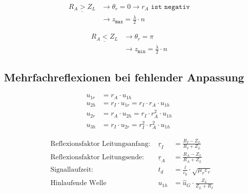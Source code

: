 \begin{align*}
    \underline{R_A > Z_L} & \rightarrow\theta_r = 0 \rightarrow r_A \texttt{ ist negativ} \\
                          & \rightarrow z_\texttt{max}=\frac{\lambda}{2}\cdot n
\end{align*}

\begin{align*}
    \underline{R_A < Z_L} & \rightarrow\theta_r = \pi                           \\
                          & \rightarrow z_\texttt{min}=\frac{\lambda}{2}\cdot n
\end{align*}

\columnbreak
\subsection{Mehrfachreflexionen bei fehlender Anpassung}

\begin{align*}
    u_{1r} & = r_A\cdot u_{1h}                                \\
    u_{2h} & = r_I\cdot u_{1r} = r_I\cdot r_A\cdot u_{1h}     \\
    u_{2r} & = r_A\cdot u_{2h} = r_I\cdot r_A^2\cdot u_{1h}   \\
    u_{3h} & = r_I\cdot u_{2r} = r_I^2\cdot r_A^2\cdot u_{1h}
\end{align*}

\begin{align*}
     & \text{Reflexionsfaktor Leitungsanfang: } & \underline{r}_I & = \frac{R_I - Z_L}{R_I + Z_L}                 \\
     & \text{Reflexionsfaktor Leitungsende: }   & \underline{r}_A & = \frac{R_A - Z_L}{R_A + Z_L}                 \\
     & \text{Signallaufzeit: }                  & t_d             & = \frac{l}{c_0}\cdot\sqrt{\mu_r\varepsilon_r} \\
     & \text{Hinlaufende Welle}                 & u_{1h}          & = \hat{u}_G \cdot\frac{Z_L}{Z_L+R_I}
\end{align*}
